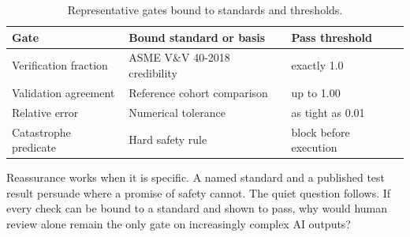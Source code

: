 \begin{table}[H]
\footnotesize
\begin{tabularx}{\textwidth}{@{}L{3.4cm} Y L{3.0cm}@{}}
\toprule
\textbf{Gate} & \textbf{Bound standard or basis} & \textbf{Pass threshold}\\
\midrule
Verification fraction & ASME V\&V 40-2018 credibility & exactly 1.0\\
Validation agreement & Reference cohort comparison & up to 1.00\\
Relative error & Numerical tolerance & as tight as 0.01\\
Catastrophe predicate & Hard safety rule & block before execution\\
\bottomrule
\end{tabularx}
\caption{Representative gates bound to standards and thresholds.}
\label{tab:trust}
\end{table}

Reassurance works when it is specific. A named standard and a published test
result persuade where a promise of safety cannot. The quiet question follows. If
every check can be bound to a standard and shown to pass, why would human review
alone remain the only gate on increasingly complex AI outputs?
